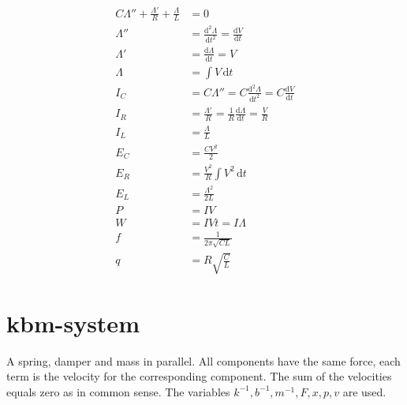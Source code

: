 \documentclass[]{elementary-physics}
\begin{document}
\begin{subequations}
\begin{align}
C \Lambda'' + \frac{\Lambda'}{R} + \frac{\Lambda}{L} &= 0 \\
\Lambda'' &= \frac{\mathrm{d}^2 \Lambda}{\mathrm{d}t^2} = \frac{\mathrm{d}V}{\mathrm{d}t} \\
\Lambda' &= \frac{\mathrm{d} \Lambda}{\mathrm{d}t} = V \tag{Faraday's law} \\
\Lambda &= \int V \, \mathrm{d}t \\
I_C &= C \Lambda'' = C \frac{\mathrm{d}^2 \Lambda}{\mathrm{d}t^2} = C \frac{\mathrm{d}V}{\mathrm{d}t} \\
I_R &= \frac{\Lambda'}{R} = \frac{1}{R} \frac{\mathrm{d}\Lambda}{\mathrm{d}t} = \frac{V}{R} \\
I_L &= \frac{\Lambda}{L} \tag{definition of inductance} \\
E_C &= \frac{C V^2}{2} \tag{energy in a capacitor} \\
E_R &= \frac{V^2}{R} \int V^2 \, \mathrm{d}t \tag{losses} \\
E_L &= \frac{\Lambda^2}{2 L} \tag{energy in a coil} \\
P &= I V \tag{power} \\
W &= I V t = I \Lambda \tag{work} \\
f &= \frac{1}{2 \pi \sqrt{C L}} \tag{frequency} \\
q &= R \sqrt{\frac{C}{L}} \tag{quality factor}
\end{align}
\end{subequations}

\pagebreak

\section{kbm-system}

A spring, damper and mass in parallel.
All components have the same force, each term is the velocity for the corresponding component.
The sum of the velocities equals zero as in common sense.
The variables $k^{-1},b^{-1},m^{-1},F,x,p,v$ are used.
\end{document}
